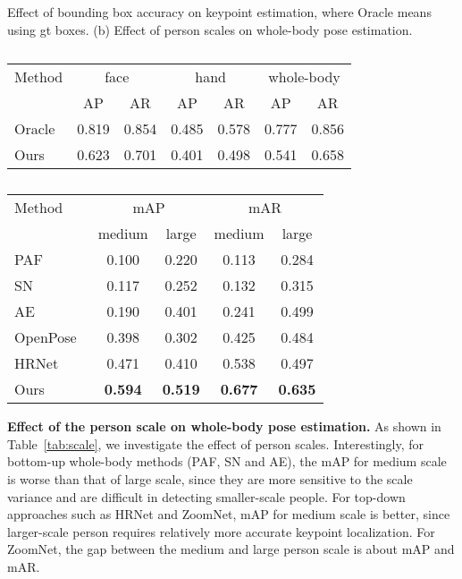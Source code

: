\documentclass[runningheads]{llncs}
\begin{document}
	\renewcommand{\arraystretch}{1.3}
	\begin{table}[t]
		\caption{Effect of bounding box accuracy on keypoint estimation, where Oracle means using gt boxes. (b) Effect of person scales on whole-body pose estimation.}
		\begin{subtable}[b]{.5\textwidth}
			\centering
			\scriptsize
			\begin{tabular}{l|cc|cc|cc}
				\hline
				Method & \multicolumn{2}{c|}{face}  & \multicolumn{2}{c|}{hand} & \multicolumn{2}{c}{whole-body} \\
				\cline{2-7}
				&    AP  & AR     & AP    & AR   &  AP     & AR  \\
				\hline
				Oracle  & 0.819 & 0.854 & 0.485 & 0.578 & 0.777 & 0.856   \\
				Ours  & 0.623 & 0.701 & 0.401 & 0.498 & 0.541 & 0.658  \\
				\hline
			\end{tabular}
			\caption{}
			\label{tab:personbbx}
		\end{subtable}
		\begin{subtable}[b]{.5\textwidth}
			\scriptsize
			\centering
			
			\begin{tabular}{l|cc|cc}
				\hline
				Method & \multicolumn{2}{c|}{mAP} & \multicolumn{2}{c}{mAR} \\
				\cline{2-5}
				&    medium  & large     & medium    & large   \\
				\hline
				PAF~\cite{cao2017realtime}     &   0.100  &  0.220	 & 0.113 &  0.284  \\
				SN~\cite{hidalgo2019single}     &   0.117  &  0.252	 & 0.132 &  0.315  \\
				AE~\cite{newell2017associative}        &       0.190  &  0.401   & 0.241  &  0.499\\
				OpenPose~\cite{cao2018openpose}  &       0.398 & 0.302  &    0.425  &  0.484  \\
				HRNet~\cite{sun2019deep}     &     0.471  & 0.410 &    0.538 &  0.497 \\  \hline
				Ours & \textbf{0.594} &   \textbf{0.519} &  \textbf{0.677}   & \textbf{0.635}  \\
				\hline
			\end{tabular}
			\caption{}
			\label{tab:scale}
		\end{subtable}
		\label{tab:face_and_hand}
	\end{table}
	
	
	\textbf{Effect of the person scale on whole-body pose estimation.}
	As shown in Table~\ref{tab:scale}, we investigate the effect of person scales. Interestingly, for bottom-up whole-body methods (PAF, SN and AE), the mAP for medium scale is worse than that of large scale, since they are more sensitive to the scale variance and are difficult in detecting smaller-scale people. For top-down approaches such as HRNet and ZoomNet, mAP for medium scale is better, since larger-scale person requires relatively more accurate keypoint localization. For ZoomNet, the gap between the medium and large person scale is about  mAP and  mAR.
	
\end{document}
